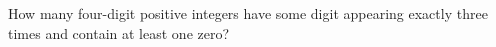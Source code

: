 How many four-digit positive integers have some digit appearing exactly three times and contain at least one zero?
